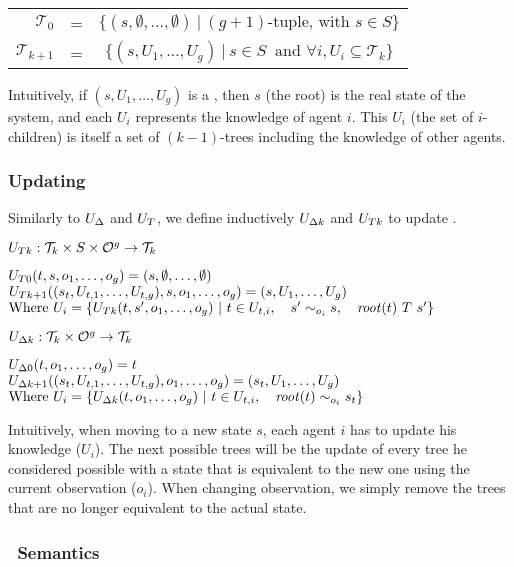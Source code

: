 \begin{tabular}{r l c}
$\mathcal{T}_0$&=&$\{(s,\emptyset,\dots,\emptyset)~|~(g+1)\text{-tuple, with }s\in S\}$\\
$\mathcal{T}_{k+1}$&=&$\{(s,U_1,\dots,U_g)~|~s\in S~\text{ and }\forall i,U_i\subseteq\mathcal{T}_k\}$
\end{tabular}

Intuitively, if $(s,U_1,\dots,U_g)$ is a \ktree, then $s$ (the root) is the real state of the system, and each $U_i$ represents the knowledge of agent $i$. This $U_i$ (the set of $i$-children) is itself a set of $(k-1)$-trees including the knowledge of other agents.

\subsubsection{Updating \ktrees}
Similarly to $U_{\Delta}$ and $U_T$, we define inductively $U_{\Delta k}$ and $U_{T k}$ to update \ktrees.

$U_{T k}:\mathcal{T}_k\times S\times \mathcal{O}^{g}\rightarrow \mathcal{T}_k$

\begin{center}
$U_{T 0}(t,s,o_1,\dots,o_g) = (s,\emptyset,\dots,\emptyset)$\\
$U_{T k+1}((s_t,U_{t,1},\dots,U_{t,g}),s,o_1,\dots,o_g)=(s,U_1,\dots,U_g)$\\
$\text{Where }U_i=\{U_{T k}(t,s',o_1,\dots,o_g)~|~t\in U_{t,i},\quad s'\sim_{o_i} s,\quad \mathit{root}(t)\ T\ s'\}$
\end{center}

$U_{\Delta k}:\mathcal{T}_k\times \mathcal{O}^{g}\rightarrow \mathcal{T}_k$

\begin{center}
$U_{\Delta 0}(t,o_1,\dots,o_g)=t$\\
$U_{\Delta k+1}((s_t,U_{t,1},\dots,U_{t,g}),o_1,\dots,o_g)=(s_t,U_1,\dots,U_g)$\\
$\text{Where }U_i=\{U_{\Delta k}(t,o_1,\dots,o_g)~|~t\in U_{t,i},\quad\mathit{root}(t)\sim_{o_i} s_t\}$
\end{center}

Intuitively, when moving to a new state $s$, each agent $i$ has to update his knowledge ($U_i$). The next possible trees will be the update of every tree he considered possible with a state that is equivalent to the new one using the current observation ($o_i$).
When changing observation, we simply remove the trees that are no longer equivalent to the actual state.

\subsubsection{\ktrees\ Semantics}

